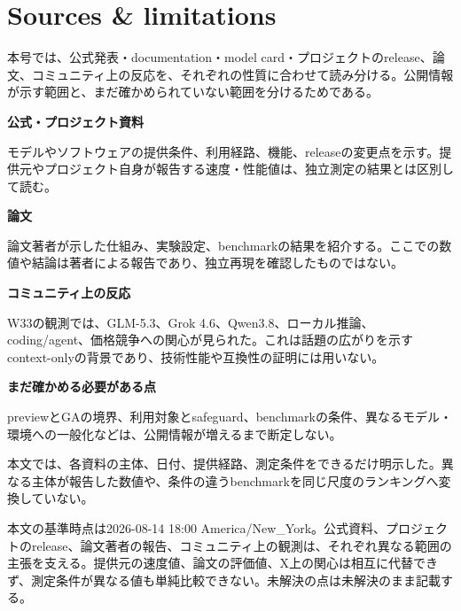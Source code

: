 \section*{Sources \& limitations}

本号では、公式発表・documentation・model card・プロジェクトのrelease、論文、コミュニティ上の反応を、それぞれの性質に合わせて読み分ける。公開情報が示す範囲と、まだ確かめられていない範囲を分けるためである。

\begin{tcolorbox}[enhanced,breakable,colback=SurveySoft,colframe=SurveyRule,boxrule=0.4pt,arc=1mm,left=3mm,right=3mm,top=2mm,bottom=2mm]
\textbf{公式・プロジェクト資料}\par
モデルやソフトウェアの提供条件、利用経路、機能、releaseの変更点を示す。提供元やプロジェクト自身が報告する速度・性能値は、独立測定の結果とは区別して読む。\par\smallskip
\textbf{論文}\par
論文著者が示した仕組み、実験設定、benchmarkの結果を紹介する。ここでの数値や結論は著者による報告であり、独立再現を確認したものではない。\par\smallskip
\textbf{コミュニティ上の反応}\par
W33の観測では、GLM-5.3、Grok 4.6、Qwen3.8、ローカル推論、coding/agent、価格競争への関心が見られた。これは話題の広がりを示すcontext-onlyの背景であり、技術性能や互換性の証明には用いない。\par\smallskip
\textbf{まだ確かめる必要がある点}\par
previewとGAの境界、利用対象とsafeguard、benchmarkの条件、異なるモデル・環境への一般化などは、公開情報が増えるまで断定しない。
\end{tcolorbox}

本文では、各資料の主体、日付、提供経路、測定条件をできるだけ明示した。異なる主体が報告した数値や、条件の違うbenchmarkを同じ尺度のランキングへ変換していない。

\nocite{ultrafast,qwen38,gemini-flash,grok46,deepseek-updates,glm53,gemini-changelog,xai-news,w33-community,daybreak-defense,daybreak-aws,daybreak-partners,vllm,llamacpp,sglang,flashinfer,vtoken,oasiskv,ripplepivot,scaffolding,swe-rpg,plugineval,agentic-transaction,redagentbench,skilltriage,videogaia,voicedesigner,comfyui}

\begin{claimboundary}
本文の基準時点は2026-08-14 18:00 America/New\_York。公式資料、プロジェクトのrelease、論文著者の報告、コミュニティ上の観測は、それぞれ異なる範囲の主張を支える。提供元の速度値、論文の評価値、X上の関心は相互に代替できず、測定条件が異なる値も単純比較できない。未解決の点は未解決のまま記載する。
\end{claimboundary}